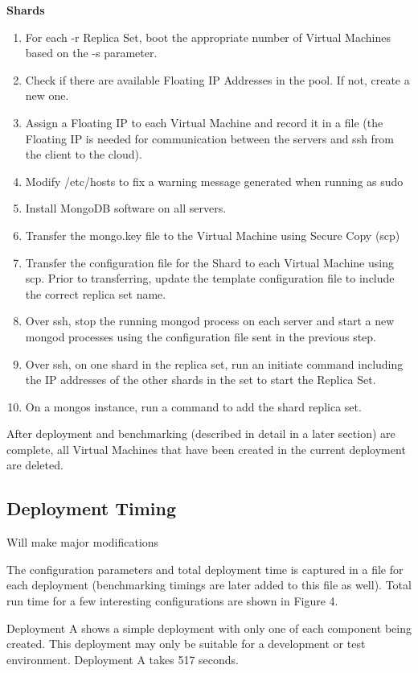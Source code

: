 \documentclass[9pt,twocolumn,twoside]{../../styles/osajnl}
\begin{document}
\textbf{Shards}
\begin{enumerate}
\item For each -r Replica Set, boot the appropriate number of Virtual Machines based on the -s parameter.
\item Check if there are available Floating IP Addresses in the pool.  If not, create a new one.
\item Assign a Floating IP to each Virtual Machine and record it in a file (the Floating IP is needed for communication between the servers and ssh from the client to the cloud).
\item Modify /etc/hosts to fix a warning message generated when running as sudo
\item Install MongoDB software on all servers.
\item Transfer the mongo.key file to the Virtual Machine using Secure Copy (scp)
\item Transfer the configuration file for the Shard to each Virtual Machine using scp.  Prior to transferring, update the template configuration file to include the correct replica set name.
\item Over ssh, stop the running mongod process on each server and start a new mongod processes using the configuration file sent in the previous step.
\item Over ssh, on one shard in the replica set, run an initiate command including the IP addresses of the other shards in the set to start the Replica Set.
\item On a mongos instance, run a command to add the shard replica set.
\end{enumerate}



After deployment and benchmarking (described in detail in a later section) are complete, all Virtual Machines that have been created in the current deployment are deleted.

\subsection{Deployment Timing}

Will make major modifications

The configuration parameters and total deployment time is captured in a file for each deployment (benchmarking timings are later added to this file as well).  Total run time for a few interesting configurations are shown in Figure 4.  

Deployment A shows a simple deployment with only one of each component being created.  This deployment may only be suitable for a development or test environment.  Deployment A takes 517 seconds.
\end{document}
